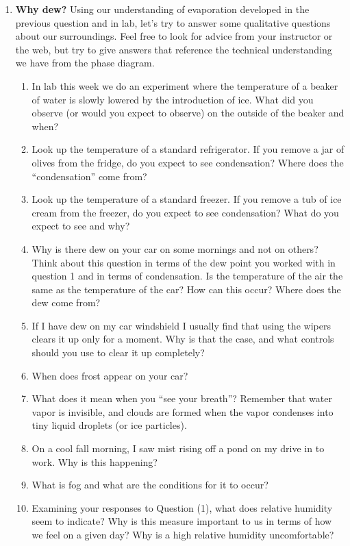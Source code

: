 \documentclass[12pt]{article}
\begin{document}
\begin{enumerate}
\item {\bf Why dew?}  Using our understanding of evaporation developed in the previous question and in lab, let's try to answer some qualitative questions about our surroundings.  Feel free to look for advice from your instructor or the web, but try to give answers that reference the technical understanding we have from the phase diagram.
	\begin{enumerate}
	\item In lab this week we do an experiment where the temperature of a beaker of water is slowly lowered by the introduction of ice.  What did you observe (or would you expect to observe) on the outside of the beaker and when? 
	\item Look up the temperature of a standard refrigerator.  If you remove a jar of olives from the fridge, do you expect to see condensation?  Where does the ``condensation'' come from?
	\item Look up the temperature of a standard freezer.  If you remove a tub of ice cream from the freezer, do you expect to see condensation?  What do you expect to see and why?
	\item Why is there dew on your car on some mornings and not on others?  Think about this question in terms of the dew point you worked with in question 1 and in terms of condensation.  Is the temperature of the air the same as the temperature of the car?  How can this occur?  Where does the dew come from?
	\item If I have dew on my car windshield I usually find that using the wipers clears it up only for a moment.  Why is that the case, and what controls should you use to clear it up completely?
	\item When does frost appear on your car?  
	\item What does it mean when you ``see your breath''?  Remember that water vapor is invisible, and clouds are formed when the vapor condenses into tiny liquid droplets (or ice particles).
	\item On a cool fall morning, I saw mist rising off a pond on my drive in to work.  Why is this happening?
	\item What is fog and what are the conditions for it to occur?
	\item Examining your responses to Question (1), what does relative humidity seem to indicate?  Why is this measure important to us in terms of how we feel on a given day?  Why is a high relative humidity uncomfortable?
	\end{enumerate}



\end{enumerate}
\end{document}
